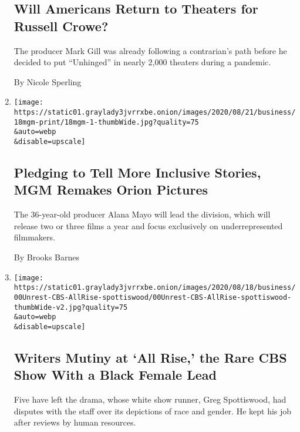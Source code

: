 \begin{enumerate}
{  \subsection{Will Americans Return to Theaters for Russell
  Crowe?}\label{will-americans-return-to-theaters-for-russell-crowe}}

  The producer Mark Gill was already following a contrarian's path
  before he decided to put ``Unhinged'' in nearly 2,000 theaters during
  a pandemic.

  By Nicole Sperling
\item
  \href{/2020/08/20/business/media/mgm-orion-pictures-alana-mayo.html}{}

  \texttt{[image: https://static01.graylady3jvrrxbe.onion/images/2020/08/21/business/18mgm-print/18mgm-1-thumbWide.jpg?quality=75\\\&auto=webp\\\&disable=upscale]}

  \hypertarget{pledging-to-tell-more-inclusive-stories-mgm-remakes-orion-pictures}{%
  \subsection{Pledging to Tell More Inclusive Stories, MGM Remakes Orion
  Pictures}\label{pledging-to-tell-more-inclusive-stories-mgm-remakes-orion-pictures}}

  The 36-year-old producer Alana Mayo will lead the division, which will
  release two or three films a year and focus exclusively on
  underrepresented filmmakers.

  By Brooks Barnes
\item
  \href{/2020/08/20/business/media/all-rise-cbs-writers.html}{}

  \texttt{[image: https://static01.graylady3jvrrxbe.onion/images/2020/08/18/business/00Unrest-CBS-AllRise-spottiswood/00Unrest-CBS-AllRise-spottiswood-thumbWide-v2.jpg?quality=75\\\&auto=webp\\\&disable=upscale]}

  \hypertarget{writers-mutiny-at-all-rise-the-rare-cbs-show-with-a-black-female-lead}{%
  \subsection{Writers Mutiny at `All Rise,' the Rare CBS Show With a
  Black Female
  Lead}\label{writers-mutiny-at-all-rise-the-rare-cbs-show-with-a-black-female-lead}}

  Five have left the drama, whose white show runner, Greg Spottiswood,
  had disputes with the staff over its depictions of race and gender. He
  kept his job after reviews by human resources.


\end{enumerate}
